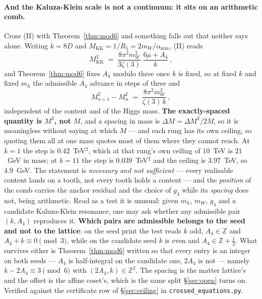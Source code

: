 \documentclass[11pt,a4paper]{article}
\newcommand{\ZZ}{\mathbb{Z}}
\newcommand{\amin}{\alpha_{\min}}
\begin{document}
\paragraph{And the Kaluza-Klein scale is not a continuum: it sits on an arithmetic comb.} Cross (II)
with Theorem~\ref{thm:mod6} and something falls out that neither says alone. Writing $k=8D$ and
$M_{\mathrm{KK}}=1/R_5=2m_W/\amin$, (II) reads
\begin{equation}\label{eq:comb}
  M_{\mathrm{KK}}^{2}\;=\;\frac{8\pi^2m_W^2}{3\zeta(3)}\;\frac{6\mu+A_4}{k}\,,
\end{equation}
and Theorem~\ref{thm:mod6} fixes $A_4$ modulo three once $k$ is fixed, so at fixed $k$ and fixed
$m_h$ the admissible $A_4$ advance in steps of three and
\begin{equation}\label{eq:comb2}
  M_{n+1}^{2}-M_{n}^{2}\;=\;\frac{8\pi^2m_W^2}{\zeta(3)\,k}\,,
\end{equation}
independent of the content and of the Higgs mass. \textbf{The exactly-spaced quantity is $M^2$, not
$M$}, and a spacing in mass is $\Delta M=\Delta M^2/2M$, so it is meaningless without saying at which
$M$ --- and each rung has its own ceiling, so quoting them all at one mass quotes most of them where
they cannot reach. At $k=1$ the step is $0.42$~TeV$^2$, which at that rung's own ceiling of
$10$~TeV is $21$~GeV in mass; at $k=11$ the step is $0.039$~TeV$^2$ and the ceiling is $3.97$~TeV,
so $4.9$~GeV. The statement is
\emph{necessary and not sufficient} --- every realisable content lands on a tooth, not every tooth
holds a content --- and the \emph{position} of the comb carries the anchor residual and the choice of
$g_4$ while its \emph{spacing} does not, being arithmetic. Read as a test it is unusual: given
$m_h$, $m_W$, $g_4$ and a candidate Kaluza-Klein resonance, one may ask whether any admissible pair
$(k,A_4)$ reproduces it. \textbf{Which pairs are admissible belongs to the seed and not to the
lattice}: on the seed \cite{KM25} print the test reads $k$ odd, $A_4\in\ZZ$ and
$A_4+k\equiv0\pmod3$, while on the candidate seed $k$ is even and $A_4\in\ZZ+\tfrac12$. What
survives either is Theorem~\ref{thm:mod6} written so that every entry is an integer on both
seeds --- $A_4$ is half-integral on the candidate one, $2A_4$ is not --- namely
$k-2A_4\equiv3\pmod6$ with $(2A_4,k)\in\ZZ^2$. The
spacing is the matter lattice's and the offset is the affine coset's, which is the same split
\S\ref{sec:open} turns on. Verified against the certificate row of
\S\ref{sec:ceiling} in \texttt{crossed\_\allowbreak equations.py}.
\end{document}
